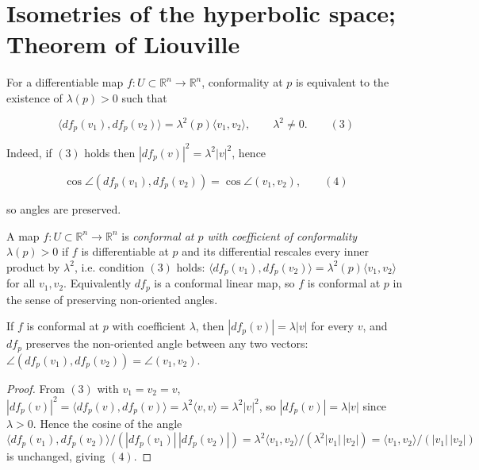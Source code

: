 \section{Isometries of the hyperbolic space; Theorem of Liouville}

For a differentiable map $f:U\subset\mathbb R^n\to\mathbb R^n$, conformality at
$p$ is equivalent to the existence of $\lambda(p)>0$ such that

$$
\langle df_p(v_1),df_p(v_2)\rangle=\lambda^2(p)\langle v_1,v_2\rangle,\qquad\lambda^2\neq 0.\qquad(3)
$$

Indeed, if $(3)$ holds then $|df_p(v)|^2=\lambda^2|v|^2$, hence

$$
\cos\angle(df_p(v_1),df_p(v_2))=\cos\angle(v_1,v_2),\qquad(4)
$$

so angles are preserved.

\begin{definition}
  \label{def:dc-ch8-5-conformal}


  A map $f:U\subset\mathbb{R}^n\to\mathbb{R}^n$ is \emph{conformal at $p$ with
  coefficient of conformality $\lambda(p)>0$} if $f$ is differentiable at $p$ and
  its differential rescales every inner product by $\lambda^2$, i.e. condition
  $(3)$ holds:
  $\langle df_p(v_1),df_p(v_2)\rangle=\lambda^2(p)\langle v_1,v_2\rangle$ for all
  $v_1,v_2$. Equivalently $df_p$ is a conformal linear map, so $f$ is conformal at
  $p$ in the sense of preserving non-oriented angles.
\end{definition}

\begin{lemma}
  \label{lem:dc-ch8-5-conformal-angle}


  If $f$ is conformal at $p$ with coefficient $\lambda$, then $|df_p(v)|=\lambda|v|$
  for every $v$, and $df_p$ preserves the non-oriented angle between any two
  vectors: $\angle(df_p(v_1),df_p(v_2))=\angle(v_1,v_2)$.
\end{lemma}
\begin{proof}

\sketch
  From $(3)$ with $v_1=v_2=v$, $|df_p(v)|^2=\langle df_p(v),df_p(v)\rangle
  =\lambda^2\langle v,v\rangle=\lambda^2|v|^2$, so $|df_p(v)|=\lambda|v|$ since
  $\lambda>0$. Hence the cosine of the angle
  $\langle df_p(v_1),df_p(v_2)\rangle/(|df_p(v_1)|\,|df_p(v_2)|)
  =\lambda^2\langle v_1,v_2\rangle/(\lambda^2|v_1|\,|v_2|)
  =\langle v_1,v_2\rangle/(|v_1|\,|v_2|)$
  is unchanged, giving $(4)$.
\end{proof}

